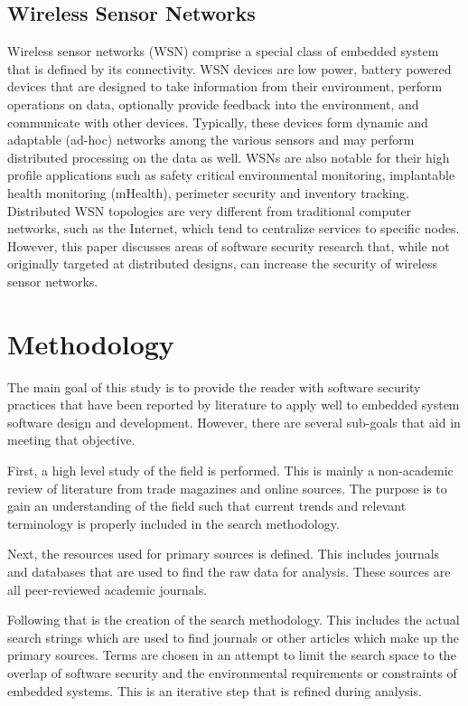 \documentclass[final,conference,11pt]{IEEEtran}
\begin{document}
\subsection{Wireless Sensor Networks}

Wireless sensor networks (WSN) comprise a special class of embedded system that is defined by its connectivity.  WSN devices are low power, battery powered devices that are designed to take information from their environment, perform operations on data, optionally provide feedback into the environment, and communicate with other devices.  Typically, these devices form dynamic and adaptable (ad-hoc) networks among the various sensors and may perform distributed processing on the data as well.\cite{Singh2011}  WSNs are also notable for their high profile applications such as safety critical environmental monitoring, implantable health monitoring (mHealth), perimeter security and inventory tracking.\cite{Bojinov2010,Mahdavi-Hezavehi2013,Sahoo2012}  Distributed WSN topologies are very different from traditional computer networks, such as the Internet, which tend to centralize services to specific nodes. However, this paper discusses areas of software security research that, while not originally targeted at distributed designs, can increase the security of wireless sensor networks.

\section{Methodology}
The main goal of this study is to provide the reader with software security practices that have been reported by literature to apply well to embedded system software design and development.  However, there are several sub-goals that aid in meeting that objective.  

First, a high level study of the field is performed.  This is mainly a non-academic review of literature from trade magazines and online sources. The purpose is to gain an understanding of the field such that current trends and relevant terminology is properly included in the search methodology.

Next, the resources used for primary sources is defined.  This includes journals and databases that are used to find the raw data for analysis.  These sources are all peer-reviewed academic journals.

Following that is the creation of the search methodology.  This includes the actual search strings which are used to find journals or other articles which make up the primary sources.  Terms are chosen in an attempt to limit the search space to the overlap of software security and the environmental requirements or constraints of embedded systems.  This is an iterative step that is refined during analysis.
\end{document}
